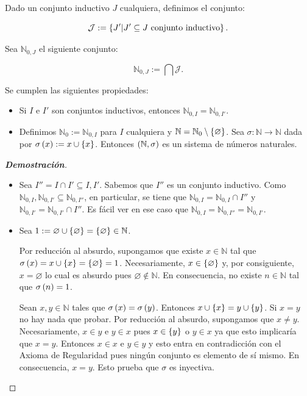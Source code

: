 \begin{proposition}
  \rm Dado un conjunto inductivo $J$ cualquiera, definimos el conjunto:
  
  \begin{equation}
    \mathcal{J}:=\left\{J'\middle|J'\subseteq J\text{ conjunto inductivo}\right\}.
  \end{equation}
  
  Sea $\mathbb{N}_{0,J}$ el siguiente conjunto:

  \begin{equation}
    \mathbb{N}_{0,J}:=\bigcap{\mathcal{J}}.
  \end{equation}

  Se cumplen las siguientes propiedades:

  \begin{itemize}
    \item[1.] Si $I$ e $I'$ son conjuntos inductivos, entonces $\mathbb{N}_{0,I}=\mathbb{N}_{0,I'}$. 
    \item[2.] Definimos $\mathbb{N}_0:=\mathbb{N}_{0,I}$ para $I$ cualquiera y $\mathbb{N}=\mathbb{N}_0\setminus\left\{\varnothing\right\}$. Sea $\sigma:\mathbb{N}\rightarrow\mathbb{N}$ dada por $\sigma\left(x\right):=x\cup\left\{x\right\}$. Entonces $\left(\mathbb{N},\sigma\right)$ es un sistema de números naturales.
  \end{itemize}
  \begin{proof}[\rm\textbf{Demostración}]
    \hfill
    \begin{itemize}
      \item[1.] Sea $I''=I\cap I'\subseteq I,I'$. Sabemos que $I''$ es un conjunto inductivo. Como $\mathbb{N}_{0,I},\mathbb{N}_{0,I'}\subseteq\mathbb{N}_{0,I''}$, en particular, se tiene que $\mathbb{N}_{0,I}=\mathbb{N}_{0,I}\cap I''$ y $\mathbb{N}_{0,I'}=\mathbb{N}_{0,I'}\cap I''$. Es fácil ver en ese caso que $\mathbb{N}_{0,I}=\mathbb{N}_{0,I''}=\mathbb{N}_{0,I'}$.
      \item[2.] Sea $1:=\varnothing\cup\left\{\varnothing\right\}=\left\{\varnothing\right\}\in\mathbb{N}$. 
      
      Por reducción al absurdo, supongamos que existe $x\in\mathbb{N}$ tal que $\sigma\left(x\right)=x\cup\left\{x\right\}=\left\{\varnothing\right\}=1$. Necesariamente, $x\in\left\{\varnothing\right\}$ y, por consiguiente, $x=\varnothing$ lo cual es absurdo pues $\varnothing\notin\mathbb{N}$. En consecuencia, no existe $n\in\mathbb{N}$ tal que $\sigma\left(n\right)=1$.
      
      Sean $x,y\in\mathbb{N}$ tales que $\sigma\left(x\right)=\sigma\left(y\right)$. Entonces $x\cup\left\{x\right\}=y\cup\left\{y\right\}$. Si $x=y$ no hay nada que probar. Por reducción al absurdo, supongamos que $x\neq y$.  Necesariamente, $x\in y$ e $y\in x$ pues $x\in\left\{y\right\}$ o $y\in x$ ya que esto implicaría que $x=y$. Entonces $x\in x$ e $y\in y$ y esto entra en contradicción con el Axioma de Regularidad pues ningún conjunto es elemento de sí mismo. En consecuencia, $x=y$. Esto prueba que $\sigma$ es inyectiva.
      

\end{itemize}
\end{proof}
\end{proposition}
